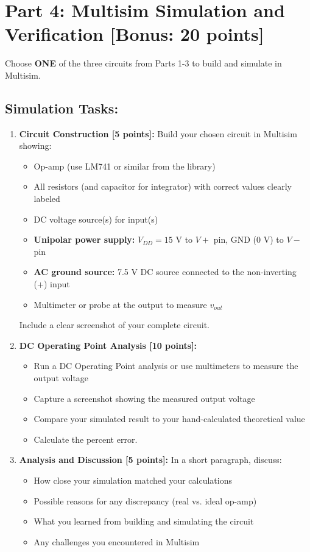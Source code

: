 \documentclass[11pt]{article}
\begin{document}
\newpage

\section*{Part 4: Multisim Simulation and Verification [Bonus: 20 points]}

Choose \textbf{ONE} of the three circuits from Parts 1-3 to build and simulate in Multisim.

\subsection*{Simulation Tasks:}

\begin{enumerate}[label=\textbf{4.\arabic*}]
    \item \textbf{Circuit Construction [5 points]:} Build your chosen circuit in Multisim showing:
    \begin{itemize}
        \item Op-amp (use LM741 or similar from the library)
        \item All resistors (and capacitor for integrator) with correct values clearly labeled
        \item DC voltage source(s) for input(s)
        \item \textbf{Unipolar power supply:} $V_{DD} = 15$ V to $V+$ pin, GND (0 V) to $V-$ pin
        \item \textbf{AC ground source:} 7.5 V DC source connected to the non-inverting (+) input
        \item Multimeter or probe at the output to measure $v_{out}$
    \end{itemize}
    Include a clear screenshot of your complete circuit.
    
    \item \textbf{DC Operating Point Analysis [10 points]:} 
    \begin{itemize}
        \item Run a DC Operating Point analysis or use multimeters to measure the output voltage
        \item Capture a screenshot showing the measured output voltage
        \item Compare your simulated result to your hand-calculated theoretical value
        \item Calculate the percent error.
    \end{itemize}
    
    \item \textbf{Analysis and Discussion [5 points]:} In a short paragraph, discuss:
    \begin{itemize}
        \item How close your simulation matched your calculations
        \item Possible reasons for any discrepancy (real vs. ideal op-amp)
        \item What you learned from building and simulating the circuit
        \item Any challenges you encountered in Multisim
    \end{itemize}
\end{enumerate}
\end{document}
